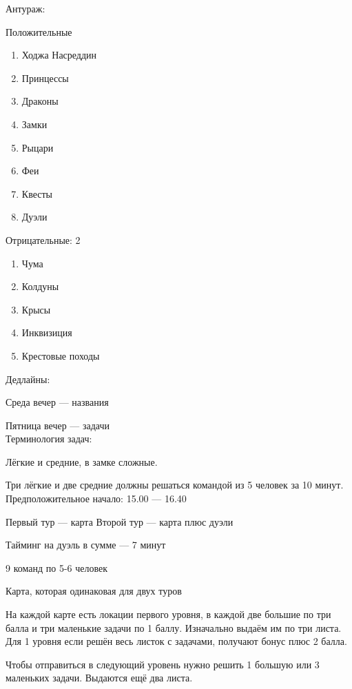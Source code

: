 \documentclass[a4paper,12pt]{article}
\begin{document}

Антураж:

Положительные\\

\begin{enumerate}
\item Ходжа Насреддин
\item Принцессы
\item Драконы
\item Замки
\item Рыцари
\item Феи
\item Квесты
\item Дуэли
\end{enumerate}

Отрицательные:
2
\begin{enumerate}
\item Чума
\item Колдуны
\item Крысы
\item Инквизиция
\item Крестовые походы
\end{enumerate}

Дедлайны:

Среда вечер — названия

Пятница вечер — задачи\\

Терминология задач:

Лёгкие и средние, в замке сложные.

Три лёгкие и две средние должны решаться командой из 5 человек за 10 минут.
\\

Предположительное начало: 15.00 — 16.40

Первый тур — карта
Второй тур — карта плюс дуэли

Тайминг на дуэль в сумме — 7 минут

9 команд по 5-6 человек



Карта, которая одинаковая для двух туров

На каждой карте есть локации первого уровня, в каждой две большие по три балла и три маленькие задачи по 1 баллу. 
Изначально выдаём им по три листа. Для 1 уровня если решён весь листок с задачами, 
получают бонус плюс 2 балла.


 Чтобы отправиться в следующий уровень нужно решить 1 большую или 3 маленьких задачи. 
 Выдаются ещё два листа.
\end{document}
